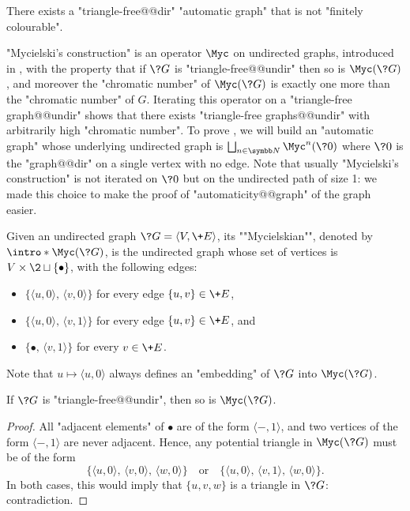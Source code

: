 \begin{proposition}
	\AP\label{prop:automatic-graph-not-fin-colourable}
	There exists a "triangle-free@@dir" "automatic graph" that is not "finitely colourable".
\end{proposition}

"Mycielski's construction" is an operator $\Myc$ on undirected graphs,
introduced in \cite{Mycielski55Coloriage}, with the property that if $\?G$ is "triangle-free@@undir"
then so is $\Myc(\?G)$, and moreover
the "chromatic number" of $\Myc(\?G)$ is exactly one more than the "chromatic number" of $G$.
Iterating this operator on a "triangle-free graph@@undir" shows that there exists
"triangle-free graphs@@undir" with arbitrarily high "chromatic number".
To prove , we will build
an "automatic graph" whose underlying undirected graph is
$\bigdcup_{n\in\N} \Myc^n(\?0)$ where $\?0$ is the "graph@@dir" on a single vertex with no edge.
Note that usually "Mycielski's construction" is not iterated on $\?0$ but on the undirected
path of size 1: we made this choice to make the proof of "automaticity@@graph" of the graph
easier.

\begin{definition}
	Given an undirected graph $\?G = \langle V, \+E \rangle$, its \AP""Mycielskian"",
	denoted by \AP$\intro*\Myc(\?G)$, is the undirected graph whose set of vertices is
	$V\times\2 \dcup \{\bullet\}$, with the following edges:
	\begin{itemize}
		\item $\{\langle u, 0 \rangle,\, \langle v, 0 \rangle\}$
			for every edge $\{ u,v \} \in \+E$,
		\item $\{\langle u, 0 \rangle,\, \langle v, 1 \rangle\}$
			for every edge $\{ u,v \} \in \+E$, and
		\item $\{ \bullet,\, \langle v, 1 \rangle\}$
			for every $v \in \+E$.
	\end{itemize}
\end{definition}

Note that $u \mapsto \langle u,0\rangle$ always defines an "embedding" of
$\?G$ into $\Myc(\?G)$.

\begin{property}
	\label{prop:triangle-free}
	If $\?G$ is "triangle-free@@undir", then so is $\Myc(\?G)$.
\end{property}

\begin{proof}
	All "adjacent elements" of $\bullet$ are of the form $\langle -, 1\rangle$,
	and two vertices of the form $\langle -, 1\rangle$ are never adjacent.
	Hence, any potential triangle in $\Myc(\?G)$ must be of the form
	\[
	\{
		\langle u, 0 \rangle,\,
		\langle v, 0 \rangle,\,
		\langle w, 0 \rangle
	\}
	\quad\text{or}\quad
	\{
		\langle u, 0 \rangle,\,
		\langle v, 1 \rangle,\,
		\langle w, 0 \rangle
	\}.
	\]
	In both cases, this would imply that $\{u,v,w\}$ is a triangle in $\?G$:
	contradiction.
\end{proof}

